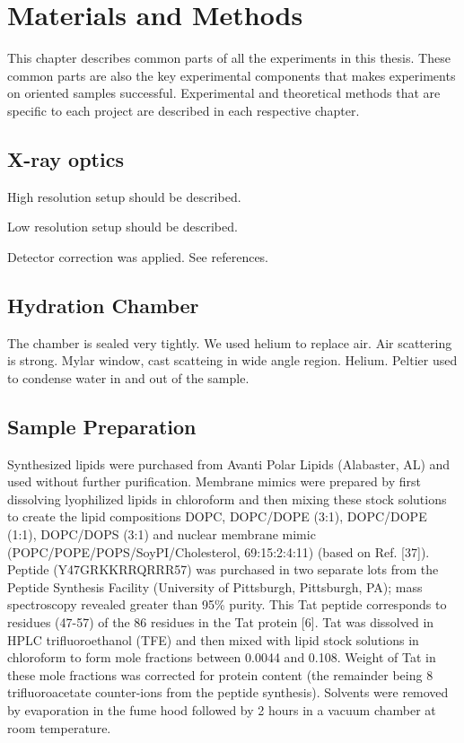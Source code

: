 \chapter{Materials and Methods}
This chapter describes common parts of all the experiments in this thesis.
These common parts are also the key experimental components that makes
experiments on oriented samples successful. Experimental and theoretical
methods that are specific to each project are described in each
respective chapter.

\section{X-ray optics}
High resolution setup should be described.

Low resolution setup should be described.

Detector correction was applied. See references.

\section{Hydration Chamber}
The chamber is sealed very tightly. We used helium to replace air. Air 
scattering is strong. 
Mylar window, cast scatteing in wide angle region. Helium. Peltier used to 
condense water in and out of the sample.  

\section{Sample Preparation}
Synthesized lipids were purchased from Avanti Polar Lipids (Alabaster, AL) and 
used without further purification. Membrane mimics were prepared by first 
dissolving lyophilized lipids in chloroform and then mixing these stock 
solutions to create the lipid compositions
DOPC, DOPC/DOPE (3:1), DOPC/DOPE (1:1), DOPC/DOPS (3:1) and nuclear membrane
mimic (POPC/POPE/POPS/SoyPI/Cholesterol, 69:15:2:4:11) (based on Ref. [37]). 
Peptide
(Y47GRKKRRQRRR57) was purchased in two separate lots from the Peptide Synthesis 
Facility
(University of Pittsburgh, Pittsburgh, PA); mass spectroscopy revealed greater
than 95\% 
purity. This Tat
peptide corresponds to residues (47-57) of the 86 residues in the Tat 
protein [6]. Tat was
dissolved in HPLC trifluoroethanol (TFE) and then mixed with lipid stock 
solutions in
chloroform to form mole fractions between 0.0044 and 0.108. Weight of Tat in 
these mole
fractions was corrected for protein content (the remainder being 8 
trifluoroacetate counter-ions
from the peptide synthesis). Solvents were removed by evaporation in the fume 
hood followed
by 2 hours in a vacuum chamber at room temperature.

